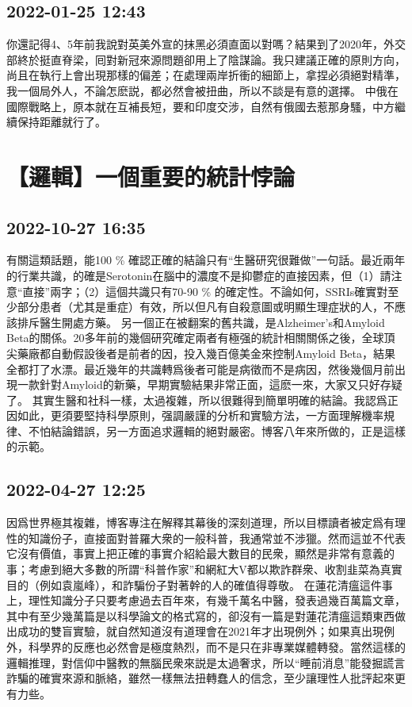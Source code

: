\documentclass[twocolumn]{ctexart}
\begin{document}
\subsection*{2022-01-25 12:43}

你還記得4、5年前我說對英美外宣的抹黑必須直面以對嗎？結果到了2020年，外交部終於挺直脊梁，囘對新冠來源問題卻用上了陰謀論。我只建議正確的原則方向，尚且在執行上會出現那樣的偏差；在處理兩岸折衝的細節上，拿捏必須絕對精準，我一個局外人，不論怎麽説，都必然會被扭曲，所以不談是有意的選擇。
中俄在國際戰略上，原本就在互補長短，要和印度交涉，自然有俄國去惹那身騷，中方繼續保持距離就行了。
\section*{【邏輯】一個重要的統計悖論}
\subsection*{2022-10-27 16:35}

有關這類話題，能100 \% 確認正確的結論只有“生醫研究很難做”一句話。最近兩年的行業共識，的確是Serotonin在腦中的濃度不是抑鬱症的直接因素，但（1）請注意“直接”兩字；（2）這個共識只有70-90 \% 的確定性。不論如何，SSRIs確實對至少部分患者（尤其是重症）有效，所以但凡有自殺意圖或明顯生理症狀的人，不應該排斥醫生開處方藥。
另一個正在被翻案的舊共識，是Alzheimer's和Amyloid  Beta的關係。20多年前的幾個研究確定兩者有極强的統計相關關係之後，全球頂尖藥廠都自動假設後者是前者的因，投入幾百億美金來控制Amyloid Beta，結果全都打了水漂。最近幾年的共識轉爲後者可能是病徵而不是病因，然後幾個月前出現一款針對Amyloid的新藥，早期實驗結果非常正面，這麽一來，大家又只好存疑了。
其實生醫和社科一樣，太過複雜，所以很難得到簡單明確的結論。我認爲正因如此，更須要堅持科學原則，强調嚴謹的分析和實驗方法，一方面理解機率規律、不怕結論錯誤，另一方面追求邏輯的絕對嚴密。博客八年來所做的，正是這樣的示範。
\subsection*{2022-04-27 12:25}

因爲世界極其複雜，博客專注在解釋其幕後的深刻道理，所以目標讀者被定爲有理性的知識份子，直接面對普羅大衆的一般科普，我通常並不涉獵。然而這並不代表它沒有價值，事實上把正確的事實介紹給最大數目的民衆，顯然是非常有意義的事；考慮到絕大多數的所謂“科普作家”和網紅大V都以欺詐群衆、收割韭菜為真實目的（例如袁嵐峰），和詐騙份子對著幹的人的確值得尊敬。
在蓮花清瘟這件事上，理性知識分子只要考慮過去百年來，有幾千萬名中醫，發表過幾百萬篇文章，其中有至少幾萬篇是以科學論文的格式寫的，卻沒有一篇是對蓮花清瘟這類東西做出成功的雙盲實驗，就自然知道沒有道理會在2021年才出現例外；如果真出現例外，科學界的反應也必然會是極度熱烈，而不是只在非專業媒體轉發。當然這樣的邏輯推理，對信仰中醫教的無腦民衆來説是太過奢求，所以“睡前消息”能發掘謊言詐騙的確實來源和脈絡，雖然一樣無法扭轉蠢人的信念，至少讓理性人批評起來更有力些。
\end{document}
